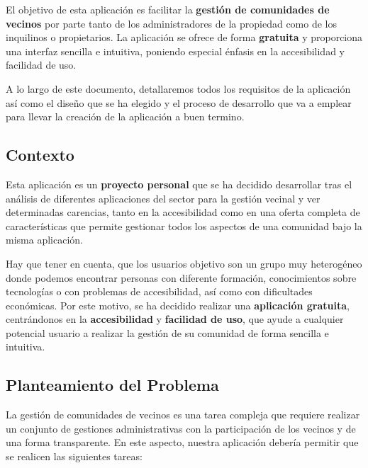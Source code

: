 El objetivo de esta aplicación es facilitar la \textbf{gestión de comunidades de vecinos} por parte tanto de los administradores de la propiedad como de los inquilinos o propietarios. La aplicación se ofrece de forma \textbf{gratuita} y proporciona una interfaz sencilla e intuitiva, poniendo especial énfasis en la accesibilidad y facilidad de uso. 

A lo largo de este documento, detallaremos todos los requisitos de la aplicación así como el diseño que se ha elegido y el proceso de desarrollo que va a emplear para llevar la creación de la aplicación a buen termino.

\subsection{Contexto}
Esta aplicación es un \textbf{proyecto personal} que se ha decidido desarrollar tras el análisis de diferentes aplicaciones del sector para la gestión vecinal y ver determinadas carencias, tanto en la accesibilidad como en una oferta completa de características que permite gestionar todos los aspectos de una comunidad bajo la misma aplicación.

Hay que tener en cuenta, que los usuarios objetivo son un grupo muy heterogéneo donde podemos encontrar personas con diferente formación, conocimientos sobre tecnologías o con problemas de accesibilidad, así como con dificultades económicas. Por este motivo, se ha decidido realizar una \textbf{aplicación gratuita}, centrándonos en la \textbf{accesibilidad} y \textbf{facilidad de uso}, que ayude a cualquier potencial usuario a realizar la gestión de su comunidad de forma sencilla e intuitiva. 

\subsection{Planteamiento del Problema}
La gestión de comunidades de vecinos es una tarea compleja que requiere realizar un conjunto de gestiones administrativas con la participación de los vecinos y de una forma transparente. En este aspecto, nuestra aplicación debería permitir que se realicen las siguientes tareas:


